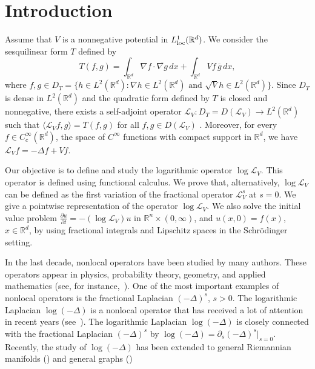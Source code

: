 \documentclass[10pt, a4paper, reqno]{amsart}
\theoremstyle{definition}
\theoremstyle{remark}
\newcommand{\red}[1]{{\color{red!80} #1}}
\newcommand{\blue}[1]{{\color{blue!80} #1}}
\numberwithin{equation}{section}
\begin{document}
\maketitle

\section{Introduction}
Assume that $V$ is a nonnegative potential in $L^1_{\textup{loc}}(\mathbb{R}^d)$. We consider the sesquilinear form $T$ defined by 
\begin{equation*}
    T(f,g) = \int_{\mathbb{R}^d} \nabla f \cdot \overline{\nabla g} \, dx + \int_{\mathbb{R}^d} V f \,\overline{g}\, dx,
\end{equation*}
where $f, g \in D_T = \{h \in L^2(\mathbb{R}^d): \nabla h \in L^2(\mathbb{R}^d) \text{ and } \sqrt{V} h \in L^2(\mathbb{R}^d)\}$. Since $D_T$ is dense in $L^2(\mathbb{R}^d)$ and the quadratic form defined by $T$ is closed and nonnegative, there exists a self-adjoint operator \linebreak $\mathcal{L}_V: D_T =  D(\mathcal{L}_V)  \rightarrow L^2(\mathbb{R}^d)$ such that $\langle \mathcal{L}_V f, g\rangle = T(f,g)$ for all $f, g \in D(\mathcal{L}_V)$ \cite[Theorem VIII.15]{ReSi}. Moreover, for every $f \in C^\infty_c(\mathbb{R}^d)$, the space of $C^\infty$ functions with compact support in $\mathbb{R}^d$, we have $\mathcal{L}_V f = -\Delta f + V f$.

Our objective is to define and study the logarithmic operator $\log \mathcal{L}_V$. This operator is defined using functional calculus. We prove that, alternatively, $\log \mathcal{L}_V$ can be defined as the first variation of the fractional operator $\mathcal{L}_V^{s}$ at $s=0$. We give a pointwise representation of the operator $\log \mathcal{L}_V$. We also solve the initial value problem $\frac{\partial u}{\partial t}=-(\log\mathcal L_V)u$ in $\mathbb R^n\times (0,\infty)$, and $u(x,0)=f(x)$, $x\in \mathbb R^d$, by using fractional integrals and Lipschitz spaces in the Schr\"odinger setting.

In the last decade, nonlocal operators have been studied by many authors. These operators appear in physics, probability theory, geometry, and applied mathematics (see, for instance,~\cite{CS,  FJW, JX, LL, LPW, Lu, RS, SV}). One of the most important examples of nonlocal operators is the fractional Laplacian $(-\Delta)^s$, $s>0$. The logarithmic Laplacian $\log (-\Delta)$ is a nonlocal operator that has received a lot of attention in recent years (see~\cite{Ch-orderm, ChHW, ChV2, ChV1, ChW, Ch-manifolds, ChX, Feu1, Feu2, HLS, HLW, LW, Lee}). The logarithmic Laplacian $\log (-\Delta)$ is closely connected with the fractional Laplacian $(-\Delta)^s$ by $\log (-\Delta) = \partial_s (-\Delta)^s |_{s=0}$. Recently, the study of $\log(-\Delta)$ has been extended to general Riemannian manifolds (\cite{Ch-manifolds}) and general graphs (\cite{ChX}) %
\end{document}
